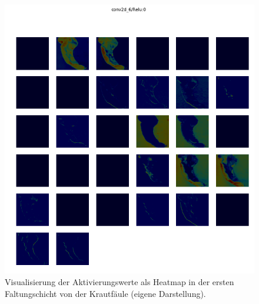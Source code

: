 
\begin{figure}[h!]
	\centering
	\includegraphics[width=\textwidth]{visualisierungen/late/heatmap_mit/conv2d_6.png}
	\caption{Visualisierung der Aktivierungswerte als Heatmap in der ersten Faltungschicht von der Krautfäule (eigene Darstellung).}
	\label{}
\end{figure}

